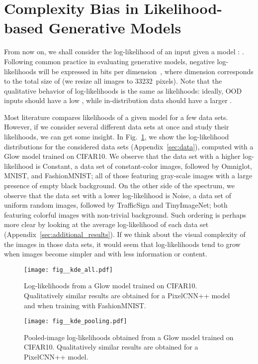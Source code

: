 \documentclass[letterpaper]{article} \usepackage{iclr2020_conference,times}
\begin{document}
\section{Complexity Bias in Likelihood-based Generative Models}
\label{sec:complex}

From now on, we shall consider the log-likelihood of an input  given a model : . Following common practice in evaluating generative models, negative log-likelihoods  will be expressed in bits per dimension~\citep{Theis16ICLR}, where dimension corresponds to the total size of  (we resize all images to 33232~pixels). Note that the qualitative behavior of log-likelihoods is the same as likelihoods: ideally, OOD inputs should have a low , while in-distribution data should have a larger . 

Most literature compares likelihoods of a given model for a few data sets. However, if we consider several different data sets at once and study their likelihoods, we can get some insight. In Fig.~\ref{fig:kde_all}, we show the log-likelihood distributions for the considered data sets (Appendix~\ref{sec:data}), computed with a Glow model trained on CIFAR10. We observe that the data set with a higher log-likelihood is Constant, a data set of constant-color images, followed by Omniglot, MNIST, and FashionMNIST; all of those featuring gray-scale images with a large presence of empty black background. On the other side of the spectrum, we observe that the data set with a lower log-likelihood is Noise, a data set of uniform random images, followed by TrafficSign and TinyImageNet; both featuring colorful images with non-trivial background. Such ordering is perhaps more clear by looking at the average log-likelihood of each data set (Appendix~\ref{sec:additional_results}). If we think about the visual complexity of the images in those data sets, it would seem that log-likelihoods tend to grow when images become simpler and with less information or content. 

\begin{figure}[t]
    \begin{center}
        \texttt{[image: fig\_\_kde\_all.pdf]}
    \end{center}
    \caption{Log-likelihoods from a Glow model trained on CIFAR10. Qualitatively similar results are obtained for a PixelCNN++ model and when training with FashionMNIST.}
    \label{fig:kde_all}
\end{figure}

\begin{figure}[t]
    \begin{center}
        \texttt{[image: fig\_\_kde\_pooling.pdf]}
    \end{center}
    \caption{Pooled-image log-likelihoods obtained from a Glow model trained on CIFAR10. Qualitatively similar results are obtained for a PixelCNN++ model.}
    \label{fig:kde_pooling}
\end{figure}
\end{document}
